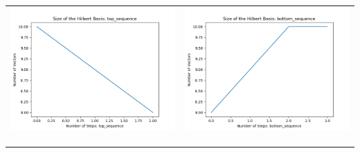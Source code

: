 \documentclass[10pt]{article}
\begin{document}
\begin{tabular}{c|c}
\begin{minipage}{.45\textwidth}
\includegraphics[width=\textwidth]{"DATA/5d/6 generators 1 bound G/top_sequence SIZE"}
\end{minipage} &
\begin{minipage}{.45\textwidth}
\includegraphics[width=\textwidth]{"DATA/5d/6 generators 1 bound G bottomup/bottom_sequence SIZE"}
\end{minipage} \\ \\
\hline \\\begin{minipage}{.45\textwidth}

\end{minipage}
\end{tabular}
\end{document}
